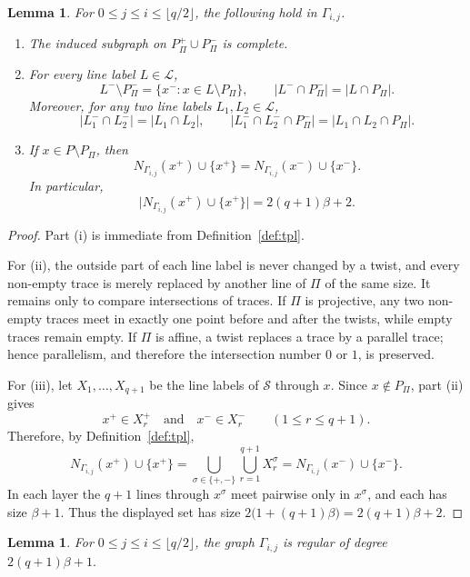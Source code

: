 \documentclass[reqno,a4paper,11pt]{article}
\newtheorem{lem}[thm]{Lemma}
\theoremstyle{definition}
\theoremstyle{remark}
\begin{document}
\begin{lem}\label{lem:basic-structure}
For $0\le j\le i\le \lfloor q/2\rfloor$, the following hold in $\Gamma_{i,j}$.
\begin{enumerate}[label=\textup{(\roman*)}]
\item The induced subgraph on $P_\Pi^+\cup P_\Pi^-$ is complete.
\item For every line label $L\in\mathcal L$,
\[
L^-\setminus P_\Pi^-=\{x^-:x\in L\setminus P_\Pi\},
\qquad
|L^-\cap P_\Pi^-|=|L\cap P_\Pi|.
\]
Moreover, for any two line labels $L_1,L_2\in\mathcal L$,
\[
|L_1^-\cap L_2^-|=|L_1\cap L_2|,
\qquad
|L_1^-\cap L_2^-\cap P_\Pi^-|=|L_1\cap L_2\cap P_\Pi|.
\]
\item If $x\in P\setminus P_\Pi$, then
\[
N_{\Gamma_{i,j}}(x^+)\cup\{x^+\}
=
N_{\Gamma_{i,j}}(x^-)\cup\{x^-\}.
\]
In particular,
\[
\bigl|N_{\Gamma_{i,j}}(x^+)\cup\{x^+\}\bigr|=2(q+1)\beta+2.
\]
\end{enumerate}
\end{lem}

\begin{proof}
Part (i) is immediate from Definition~\ref{def:tpl}.

For (ii), the outside part of each line label is never changed by a twist, and every non-empty trace is merely replaced by another line of $\Pi$ of the same size.
It remains only to compare intersections of traces.
If $\Pi$ is projective, any two non-empty traces meet in exactly one point before and after the twists, while empty traces remain empty.
If $\Pi$ is affine, a twist replaces a trace by a parallel trace; hence parallelism, and therefore the intersection number $0$ or $1$, is preserved.


For (iii), let $X_1,\dots,X_{q+1}$ be the line labels of $\mathcal S$ through $x$.
Since $x\notin P_\Pi$, part (ii) gives
\[
x^+\in X_r^+\quad\text{and}\quad x^-\in X_r^-
\qquad (1\le r\le q+1).
\]
Therefore, by Definition~\ref{def:tpl},
\[
N_{\Gamma_{i,j}}(x^+)\cup\{x^+\}
=
\bigcup_{\sigma\in\{+,-\}}\bigcup_{r=1}^{q+1}X_r^\sigma
=
N_{\Gamma_{i,j}}(x^-)\cup\{x^-\}.
\]
In each layer the $q+1$ lines through $x^\sigma$ meet pairwise only in $x^\sigma$, and each has size $\beta+1$.
Thus the displayed set has size
$2\bigl(1+(q+1)\beta\bigr)=2(q+1)\beta+2.$
\end{proof}

\begin{lem}\label{lem:regular-degree}
For $0\le j\le i\le \lfloor q/2\rfloor$, the graph $\Gamma_{i,j}$ is regular of degree
$2(q+1)\beta+1.$
\end{lem}
\end{document}
